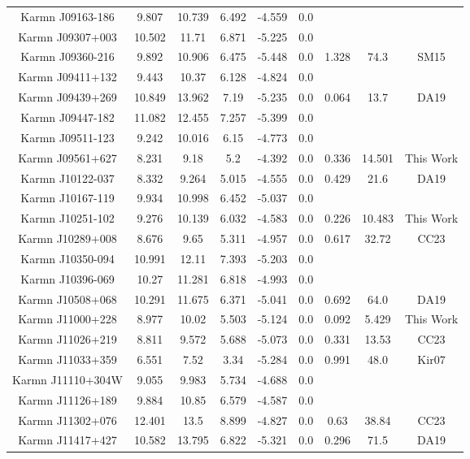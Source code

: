 \begin{longtable}{ccccccccc}
    Karmn J09163-186 & 9.807 & 10.739 & 6.492 & -4.559 & 0.0 &  &  &  \\
    Karmn J09307+003 & 10.502 & 11.71 & 6.871 & -5.225 & 0.0 &  &  &  \\
    Karmn J09360-216 & 9.892 & 10.906 & 6.475 & -5.448 & 0.0 & 1.328 & 74.3 & SM15 \\
    Karmn J09411+132 & 9.443 & 10.37 & 6.128 & -4.824 & 0.0 &  &  &  \\
    Karmn J09439+269 & 10.849 & 13.962 & 7.19 & -5.235 & 0.0 & 0.064 & 13.7 & DA19 \\
    Karmn J09447-182 & 11.082 & 12.455 & 7.257 & -5.399 & 0.0 &  &  &  \\
    Karmn J09511-123 & 9.242 & 10.016 & 6.15 & -4.773 & 0.0 &  &  &  \\
    Karmn J09561+627 & 8.231 & 9.18 & 5.2 & -4.392 & 0.0 & 0.336 & 14.501 & This Work \\
    Karmn J10122-037 & 8.332 & 9.264 & 5.015 & -4.555 & 0.0 & 0.429 & 21.6 & DA19 \\
    Karmn J10167-119 & 9.934 & 10.998 & 6.452 & -5.037 & 0.0 &  &  &  \\
    Karmn J10251-102 & 9.276 & 10.139 & 6.032 & -4.583 & 0.0 & 0.226 & 10.483 & This Work \\
    Karmn J10289+008 & 8.676 & 9.65 & 5.311 & -4.957 & 0.0 & 0.617 & 32.72 & CC23 \\
    Karmn J10350-094 & 10.991 & 12.11 & 7.393 & -5.203 & 0.0 &  &  &  \\
    Karmn J10396-069 & 10.27 & 11.281 & 6.818 & -4.993 & 0.0 &  &  &  \\
    Karmn J10508+068 & 10.291 & 11.675 & 6.371 & -5.041 & 0.0 & 0.692 & 64.0 & DA19 \\
    Karmn J11000+228 & 8.977 & 10.02 & 5.503 & -5.124 & 0.0 & 0.092 & 5.429 & This Work \\
    Karmn J11026+219 & 8.811 & 9.572 & 5.688 & -5.073 & 0.0 & 0.331 & 13.53 & CC23 \\
    Karmn J11033+359 & 6.551 & 7.52 & 3.34 & -5.284 & 0.0 & 0.991 & 48.0 & Kir07 \\
    Karmn J11110+304W & 9.055 & 9.983 & 5.734 & -4.688 & 0.0 &  &  &  \\
    Karmn J11126+189 & 9.884 & 10.85 & 6.579 & -4.587 & 0.0 &  &  &  \\
    Karmn J11302+076 & 12.401 & 13.5 & 8.899 & -4.827 & 0.0 & 0.63 & 38.84 & CC23 \\
    Karmn J11417+427 & 10.582 & 13.795 & 6.822 & -5.321 & 0.0 & 0.296 & 71.5 & DA19 \\

\end{longtable}
